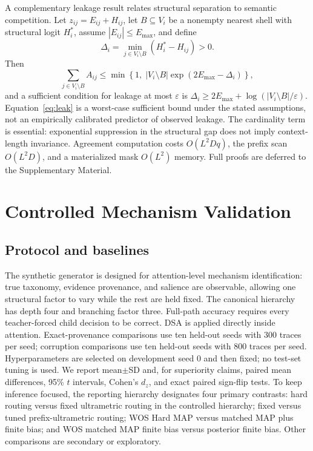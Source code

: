 \documentclass[preprint,11pt]{elsarticle}
\begin{document}
A complementary leakage result relates structural separation to semantic competition. Let $z_{ij}=E_{ij}+H_{ij}$, let $B\subseteq V_i$ be a nonempty nearest shell with structural logit $H_i^*$, assume $|E_{ij}|\leq E_{\max}$, and define
\[
\Delta_i=\min_{j\in V_i\setminus B}(H_i^*-H_{ij})>0.
\]
Then
\begin{equation}
 \sum_{j\in V_i\setminus B}A_{ij}
 \leq \min\left\{1,\;|V_i\setminus B|\exp(2E_{\max}-\Delta_i)\right\},
 \label{eq:leak}
\end{equation}
and a sufficient condition for leakage at most $\varepsilon$ is $\Delta_i\geq2E_{\max}+\log(|V_i\setminus B|/\varepsilon)$. Equation~\eqref{eq:leak} is a worst-case sufficient bound under the stated assumptions, not an empirically calibrated predictor of observed leakage. The cardinality term is essential: exponential suppression in the structural gap does not imply context-length invariance. Agreement computation costs $O(L^2Dq)$, the prefix scan $O(L^2D)$, and a materialized mask $O(L^2)$ memory. Full proofs are deferred to the Supplementary Material.

\section{Controlled Mechanism Validation}
\subsection{Protocol and baselines}
The synthetic generator is designed for attention-level mechanism identification: true taxonomy, evidence provenance, and salience are observable, allowing one structural factor to vary while the rest are held fixed. The canonical hierarchy has depth four and branching factor three. Full-path accuracy requires every teacher-forced child decision to be correct. DSA is applied directly inside attention. Exact-provenance comparisons use ten held-out seeds with 300 traces per seed; corruption comparisons use ten held-out seeds with 800 traces per seed. Hyperparameters are selected on development seed 0 and then fixed; no test-set tuning is used. We report mean$\pm$SD and, for superiority claims, paired mean differences, 95\% $t$ intervals, Cohen's $d_z$, and exact paired sign-flip tests. To keep inference focused, the reporting hierarchy designates four primary contrasts: hard routing versus fixed ultrametric routing in the controlled hierarchy; fixed versus tuned prefix-ultrametric routing; WOS Hard MAP versus matched MAP plus finite bias; and WOS matched MAP finite bias versus posterior finite bias. Other comparisons are secondary or exploratory.
\end{document}
